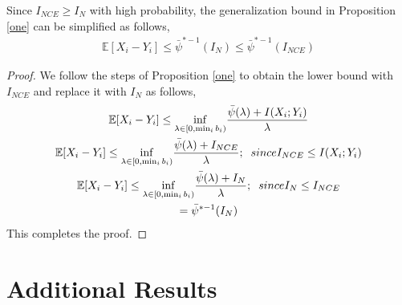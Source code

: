 \documentclass{article}
\begin{document}
\begin{customthm}{4}
  Since $I_{NCE} \geq I_{N}$ with high probability, the generalization bound in Proposition \autoref{one} can be simplified as follows,
  \begin{gather}
    \mathbb{E}[X_{i} - Y_{i}] \leq \bar{\psi}^{*-1}(I_{N}) \leq \bar{\psi}^{*-1}(I_{NCE}) \nonumber
  \end{gather} 
\end{customthm}
\begin{proof}
  We follow the steps of Proposition \autoref{one} to obtain the lower bound with $I_{NCE}$ and replace it with $I_{N}$ as follows,
  \begin{gather}
    \mathbb{E}[X_{i} - Y_{i}] \leq \underset{\lambda \in [0,\min_{i}b_{i})}{\inf} \frac{\bar{\psi}(\lambda)+I(X_{i};Y_{i})}{\lambda} \nonumber \\
    \mathbb{E}[X_{i} - Y_{i}] \leq \underset{\lambda \in [0,\min_{i}b_{i})}{\inf} \frac{\bar{\psi}(\lambda)+I_{NCE}}{\lambda}; \;\text\;{since} I_{NCE} \leq I(X_{i};Y_{i}) \nonumber\\
    \mathbb{E}[X_{i} - Y_{i}] \leq \underset{\lambda \in [0,\min_{i}b_{i})}{\inf} \frac{\bar{\psi}(\lambda)+I_{N}}{\lambda}; \;\text\;{since} I_{N} \leq I_{NCE} \nonumber\\
    = \bar{\psi}^{*-1}(I_{N}) \nonumber
  \end{gather}
  This completes the proof.

\end{proof}

\section{Additional Results}
\end{document}
